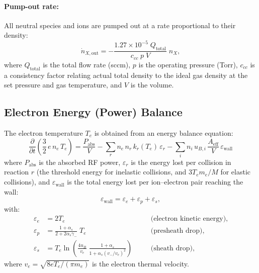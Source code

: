 \documentclass[11pt,a4paper]{article}
\newcommand{\ddt}[1]{\frac{\partial #1}{\partial t}}
\newcommand{\Te}{\ensuremath{T_e}}
\renewcommand{\ne}{\ensuremath{n_e}}
\begin{document}
\paragraph{Pump-out rate:}
All neutral species and ions are pumped out at a rate proportional to their
density:
\begin{equation}
  \label{eq:pump_out}
  \dot{n}_{X,\text{out}} = -\frac{1.27 \times 10^{-5}\;Q_{\text{total}}}{c_{cc}\;p\;V}\;n_X,
\end{equation}
where $Q_{\text{total}}$ is the total flow rate (sccm), $p$ is the operating
pressure (Torr), $c_{cc}$ is a consistency factor relating actual total density
to the ideal gas density at the set pressure and gas temperature, and $V$ is
the volume.


\subsection{Electron Energy (Power) Balance}
\label{sec:power}

The electron temperature $\Te$ is obtained from an energy balance equation:
\begin{equation}
  \label{eq:power_balance}
  \boxed{
  \ddt{}\!\left(\frac{3}{2}\,e\,\ne\,\Te\right)
    = \frac{P_{\text{abs}}}{V}
    - \sum_r \ne\,n_r\,k_r(\Te)\,\varepsilon_r
    - \sum_i n_i\,u_{B,i}\,\frac{A_{\text{eff}}}{V}\,\varepsilon_{\text{wall}}
  }
\end{equation}
where $P_{\text{abs}}$ is the absorbed RF power, $\varepsilon_r$ is the energy
lost per collision in reaction $r$ (the threshold energy for inelastic
collisions, and $3\Te m_e/M$ for elastic collisions), and $\varepsilon_{\text{wall}}$
is the total energy lost per ion--electron pair reaching the wall:
\begin{equation}
  \label{eq:eps_wall}
  \varepsilon_{\text{wall}} = \varepsilon_e + \varepsilon_p + \varepsilon_s,
\end{equation}
with:
\begin{align}
  \varepsilon_e &= 2\Te
    &\quad&\text{(electron kinetic energy)}, \label{eq:eps_e}\\
  \varepsilon_p &= \frac{1+\alpha_s}{2+2\alpha_s\gamma_-}\;\Te
    &\quad&\text{(presheath drop)}, \label{eq:eps_p}\\
  \varepsilon_s &= \Te\ln\!\left(\frac{4u_B}{v_e}\;\frac{1+\alpha_s}{1+\alpha_s(v_-/v_e)^2}\right)
    &\quad&\text{(sheath drop)}, \label{eq:eps_s}
\end{align}
where $v_e = \sqrt{8e\Te/(\pi m_e)}$ is the electron thermal velocity.
\end{document}
